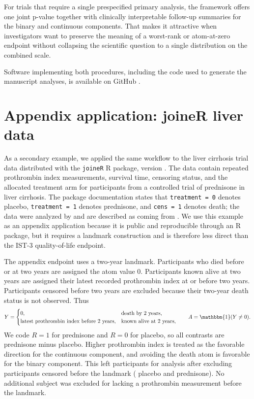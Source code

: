 \documentclass[11pt]{article}
\begin{document}
For trials that require a single prespecified primary analysis, the framework offers one joint p-value together with clinically interpretable follow-up summaries for the binary and continuous components. That makes it attractive when investigators want to preserve the meaning of a worst-rank or atom-at-zero endpoint without collapsing the scientific question to a single distribution on the combined scale.

Software implementing both procedures, including the code used to generate the manuscript analyses, is available on GitHub \citep{TruncCompGitHub}.

\clearpage
\appendix
\section{Appendix application: joineR liver data}\label{app:joiner-liver-application}

As a secondary example, we applied the same workflow to the liver cirrhosis trial data distributed with the \texttt{joineR} R package, version \LiverAppendixPackageVersion{} \citep{joineRPackage}. The data contain repeated prothrombin index measurements, survival time, censoring status, and the allocated treatment arm for \LiverAppendixRandomizedN{} participants from a controlled trial of prednisone in liver cirrhosis. The package documentation states that \texttt{treatment = 0} denotes placebo, \texttt{treatment = 1} denotes prednisone, and \texttt{cens = 1} denotes death; the data were analyzed by \citet{henderson2002identification} and are described as coming from \citet{andersen2003statistical}. We use this example as an appendix application because it is public and reproducible through an R package, but it requires a landmark construction and is therefore less direct than the IST-3 quality-of-life endpoint.

The appendix endpoint uses a two-year landmark. Participants who died before or at two years are assigned the atom value 0. Participants known alive at two years are assigned their latest recorded prothrombin index at or before two years. Participants censored before two years are excluded because their two-year death status is not observed. Thus
\[
  Y =
  \begin{cases}
    0, & \text{death by 2 years},\\
    \text{latest prothrombin index before 2 years}, & \text{known alive at 2 years},
  \end{cases}
  \qquad
  A = \mathbbm{1}(Y \ne 0).
\]
We code $R=1$ for prednisone and $R=0$ for placebo, so all contrasts are prednisone minus placebo. Higher prothrombin index is treated as the favorable direction for the continuous component, and avoiding the death atom is favorable for the binary component. This left \LiverAppendixN{} participants for analysis after excluding \LiverAppendixExcludedCensored{} participants censored before the landmark (\LiverAppendixExcludedControl{} placebo and \LiverAppendixExcludedTreatment{} prednisone). No additional subject was excluded for lacking a prothrombin measurement before the landmark.
\end{document}

